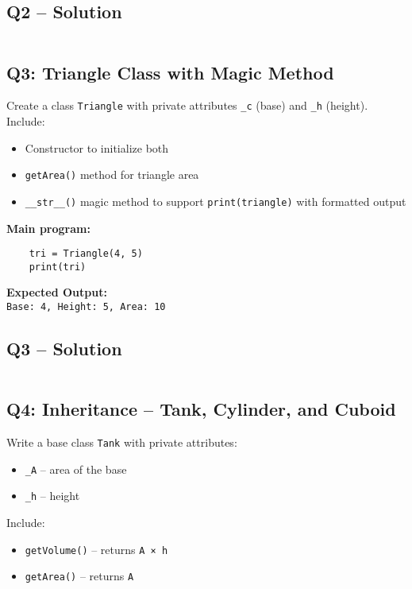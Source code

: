 \documentclass[a4paper,11pt]{article}
\begin{document}
\subsection*{Q2 – Solution}
\inputminted{python}{Files/10/2.py}

\subsection*{Q3: Triangle Class with Magic Method}
Create a class \texttt{Triangle} with private attributes \texttt{\_c} (base) and \texttt{\_h} (height). Include:

\begin{itemize}
	\item Constructor to initialize both
	\item \texttt{getArea()} method for triangle area
	\item \texttt{\_\_str\_\_()} magic method to support \texttt{print(triangle)} with formatted output
\end{itemize}

\textbf{Main program:}
\begin{verbatim}
	tri = Triangle(4, 5)
	print(tri)
\end{verbatim}

\textbf{Expected Output:}\\
\texttt{Base: 4, Height: 5, Area: 10}


\subsection*{Q3 – Solution}
\inputminted{python}{Files/10/3.py}

\subsection*{Q4: Inheritance – Tank, Cylinder, and Cuboid}
Write a base class \texttt{Tank} with private attributes:

\begin{itemize}
	\item \texttt{\_A} – area of the base
	\item \texttt{\_h} – height
\end{itemize}

Include:
\begin{itemize}
	\item \texttt{getVolume()} – returns \texttt{A × h}
	\item \texttt{getArea()} – returns \texttt{A}
\end{itemize}
\end{document}
